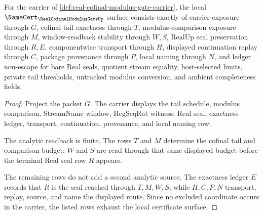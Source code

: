 \begin{theorem}
\label{thm:real-cofinal-modulus-gate-namecert-obligations}
For the carrier of \autoref{def:real-cofinal-modulus-gate-carrier}, the local $\NameCert_{\RealCofinalModulusGateUp}$ surface consists exactly of carrier exposure through $G$, cofinal-tail exactness through $T$, modulus-comparison exposure through $M$, window-readback stability through $W,S$, RealUp seal preservation through $R,E$, componentwise transport through $H$, displayed continuation replay through $C$, package provenance through $P$, local naming through $N$, and ledger non-escape for bare Real seals, quotient stream equality, host-selected limits, private tail thresholds, untracked modulus conversion, and ambient completeness fields.
\end{theorem}
\begin{proof}
Project the packet $G$. The carrier displays the tail schedule, modulus comparison, StreamName window, RegSeqRat witness, Real seal, exactness ledger, transport, continuation, provenance, and local naming row.

The analytic readback is finite. The rows $T$ and $M$ determine the cofinal tail and comparison budget; $W$ and $S$ are read through that same displayed budget before the terminal Real seal row $R$ appears.

The remaining rows do not add a second analytic source. The exactness ledger $E$ records that $R$ is the seal reached through $T,M,W,S$, while $H,C,P,N$ transport, replay, source, and name the displayed route. Since no excluded coordinate occurs in the carrier, the listed rows exhaust the local certificate surface.
\end{proof}

